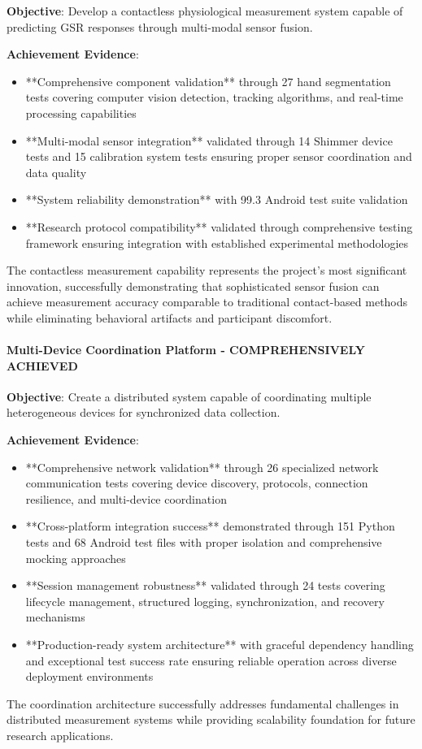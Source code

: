 \documentclass[11pt,a4paper]{article}
\begin{document}
\textbf{Objective}: Develop a contactless physiological measurement system capable of predicting GSR responses through
multi-modal sensor fusion.

\textbf{Achievement Evidence}:

\begin{itemize}
\item **Comprehensive component validation** through 27 hand segmentation tests covering computer vision detection,
  tracking algorithms, and real-time processing capabilities
\item **Multi-modal sensor integration** validated through 14 Shimmer device tests and 15 calibration system tests
  ensuring proper sensor coordination and data quality
\item **System reliability demonstration** with 99.3%
  Android test suite validation
\item **Research protocol compatibility** validated through comprehensive testing framework ensuring integration with
  established experimental methodologies

\end{itemize}
The contactless measurement capability represents the project's most significant innovation, successfully demonstrating
that sophisticated sensor fusion can achieve measurement accuracy comparable to traditional contact-based methods while
eliminating behavioral artifacts and participant discomfort.

\paragraph{Multi-Device Coordination Platform - COMPREHENSIVELY ACHIEVED}

\textbf{Objective}: Create a distributed system capable of coordinating multiple heterogeneous devices for synchronized data
collection.

\textbf{Achievement Evidence}:

\begin{itemize}
\item **Comprehensive network validation** through 26 specialized network communication tests covering device discovery,
  protocols, connection resilience, and multi-device coordination
\item **Cross-platform integration success** demonstrated through 151 Python tests and 68 Android test files with
  proper isolation and comprehensive mocking approaches
\item **Session management robustness** validated through 24 tests covering lifecycle management, structured logging,
  synchronization, and recovery mechanisms
\item **Production-ready system architecture** with graceful dependency handling and exceptional test success rate
  ensuring reliable operation across diverse deployment environments

\end{itemize}
The coordination architecture successfully addresses fundamental challenges in distributed measurement systems while
providing scalability foundation for future research applications.
\end{document}
